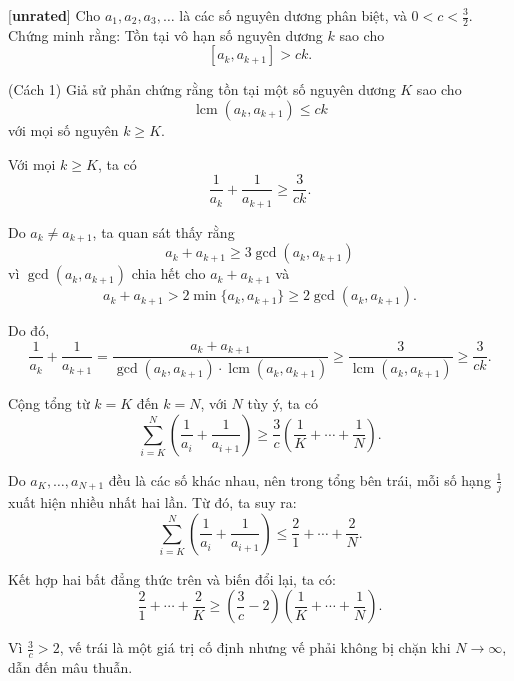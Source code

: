\documentclass[../01-divisibility.tex]{subfiles}
\begin{document}
\begin{example*}\label{example:CHN-2015-TST1-D1-P2}[\textbf{unrated}]
	Cho \( a_1, a_2, a_3, \dots \) là các số nguyên dương phân biệt, và \( 0 < c < \frac{3}{2} \).  
	Chứng minh rằng: Tồn tại vô hạn số nguyên dương \( k \) sao cho  
	\[
		[a_k, a_{k+1}] > ck.
	\]
\end{example*}

\begin{soln}(Cách 1)\footnotemark
	Giả sử phản chứng rằng tồn tại một số nguyên dương \( K \) sao cho  
	\[
		\operatorname{lcm}(a_k, a_{k+1}) \leq ck
	\]
	với mọi số nguyên \( k \geq K \).
	
	\begin{claim*}
		Với mọi \( k \geq K \), ta có
		\[
			\frac{1}{a_k} + \frac{1}{a_{k+1}} \geq \frac{3}{ck}.
		\]
	\end{claim*}
	\begin{subproof}
		Do \( a_k \neq a_{k+1} \), ta quan sát thấy rằng  
		\[
			a_k + a_{k+1} \geq 3\gcd(a_k, a_{k+1})
		\]
		vì \( \gcd(a_k, a_{k+1}) \) chia hết cho \( a_k + a_{k+1} \) và  
		\[
			a_k + a_{k+1} > 2\min\{a_k, a_{k+1}\} \geq 2\gcd(a_k, a_{k+1}).
		\]
		
		Do đó,
		\[
			\frac{1}{a_k} + \frac{1}{a_{k+1}} = \frac{a_k + a_{k+1}}{\gcd(a_k, a_{k+1}) \cdot \operatorname{lcm}(a_k, a_{k+1})} 
			\geq \frac{3}{\operatorname{lcm}(a_k, a_{k+1})} \geq \frac{3}{ck}.
		\]	
	\end{subproof}
	
	Cộng tổng từ \( k = K \) đến \( k = N \), với \( N \) tùy ý, ta có
	\[
		\sum_{i=K}^N \left( \frac{1}{a_i} + \frac{1}{a_{i+1}} \right) \geq \frac{3}{c} \left( \frac{1}{K} + \cdots + \frac{1}{N} \right).
	\]
	
	Do \( a_K, \dots, a_{N+1} \) đều là các số khác nhau, nên trong tổng bên trái, mỗi số hạng \( \frac{1}{j} \) xuất hiện nhiều nhất hai lần.
	Từ đó, ta suy ra:
	\[
		\sum_{i=K}^N \left( \frac{1}{a_i} + \frac{1}{a_{i+1}} \right) \leq \frac{2}{1} + \cdots + \frac{2}{N}.
	\]
	
	Kết hợp hai bất đẳng thức trên và biến đổi lại, ta có:
	\[
		\frac{2}{1} + \cdots + \frac{2}{K} \geq \left( \frac{3}{c} - 2 \right) \left( \frac{1}{K} + \cdots + \frac{1}{N} \right).
	\]
	
	Vì \( \frac{3}{c} > 2 \), vế trái là một giá trị cố định nhưng vế phải không bị chặn khi \( N \to \infty \), dẫn đến mâu thuẫn.
\end{soln}

\end{document}
